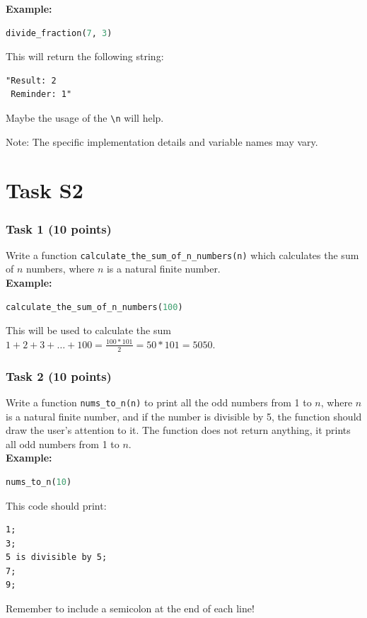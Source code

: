 \documentclass[12pt]{book}
\begin{document}
\textbf{Example:}
\begin{lstlisting}[language=Python]
divide_fraction(7, 3)
\end{lstlisting}
This will return the following string:
\begin{verbatim}
"Result: 2
 Reminder: 1"
\end{verbatim}
Maybe the usage of the \texttt{\textbackslash n} will help.

Note: The specific implementation details and variable names may vary.

\newpage
\section{Task S2}
\subsubsection{Task 1 (10 points)}
Write a function \texttt{calculate\_the\_sum\_of\_n\_numbers(n)} which calculates the sum of $n$ numbers, where $n$ is a natural finite number. \\
\textbf{Example:}
\begin{lstlisting}[language=Python]
calculate_the_sum_of_n_numbers(100)
\end{lstlisting}
This will be used to calculate the sum $1 + 2 + 3 + \dots + 100 = \frac{100*101}{2} = 50*101 = 5050$.

\subsubsection{Task 2 (10 points)}
Write a function \texttt{nums\_to\_n(n)} to print all the odd numbers from 1 to $n$, where $n$ is a natural finite number, and if the number is divisible by 5, the function should draw the user's attention to it. The function does not return anything, it prints all odd numbers from 1 to $n$. \\
\textbf{Example:}
\begin{lstlisting}[language=Python]
nums_to_n(10)
\end{lstlisting}
This code should print:
\begin{verbatim}
1;
3;
5 is divisible by 5;
7;
9;
\end{verbatim}
Remember to include a semicolon at the end of each line!
\end{document}
